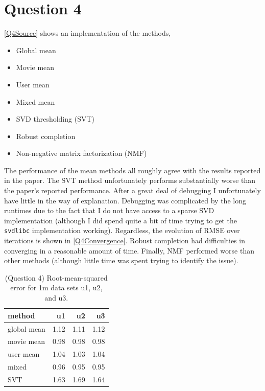 \documentclass{article}
\begin{document}
\section{Question 4}

\ref{Q4Source} shows an implementation of the methods,

\begin{itemize}
\item Global mean
\item Movie mean
\item User mean
\item Mixed mean
\item SVD thresholding (SVT)
\item Robust completion
\item Non-negative matrix factorization (NMF)
\end{itemize}

The performance of the mean methods all roughly agree with the results
reported in the paper. The SVT method unfortunately performs
substantially worse than the paper's reported performance. After a
great deal of debugging I unfortunately have little in the way of
explanation. Debugging was complicated by the long runtimes due to the
fact that I do not have access to a sparse SVD
implementation (although I did spend quite a bit of time trying to get
the {\tt svdlibc} implementation working). Regardless, the evolution
of RMSE over iterations is shown in \ref{Q4Convergence}. Robust
completion had difficulties in converging in a reasonable amount of
time. Finally, NMF performed worse than other methods (although little
time was spent trying to identify the issue).

\begin{table}
\center
\begin{tabular}{|l|rrr|}
  \hline
  method      & u1    & u2    & u3    \\
  \hline
  global mean & 1.12  & 1.11  & 1.12  \\
  movie mean  & 0.98  & 0.98  & 0.98  \\
  user mean   & 1.04  & 1.03  & 1.04  \\
  mixed       & 0.96  & 0.95  & 0.95  \\
  SVT         & 1.63  & 1.69  & 1.64  \\
  \hline
\end{tabular}
\caption{(Question 4) Root-mean-squared error for 1m data sets u1, u2, and u3.}
\end{table}
\end{document}
